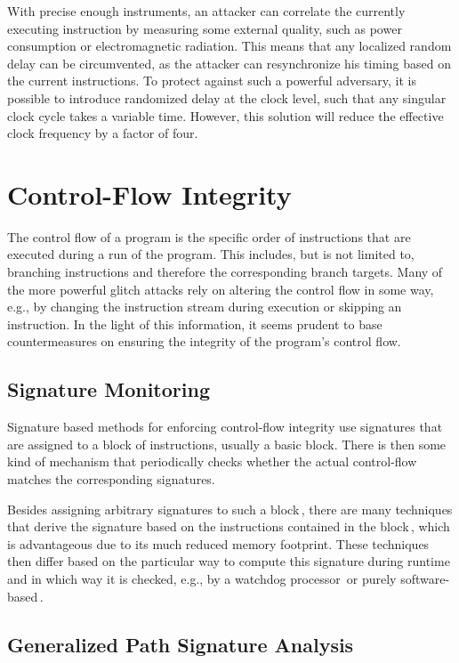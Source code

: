 With precise enough instruments, an attacker can correlate the currently executing instruction by measuring some external quality, such as power consumption or electromagnetic radiation. This means that any localized random delay can be circumvented, as the attacker can resynchronize his timing based on the current instructions. To protect against such a powerful adversary, it is possible to introduce randomized delay at the clock level, such that any singular clock cycle takes a variable time. However, this solution will reduce the effective clock frequency by a factor of four.\,\cite{kommerling1999design}

\section{Control-Flow Integrity}
The control flow of a program is the specific order of instructions that are executed during a run of the program. This includes, but is not limited to, branching instructions and therefore the corresponding branch targets. Many of the more powerful glitch attacks rely on altering the control flow in some way, e.g., by changing the instruction stream during execution or skipping an instruction. In the light of this information, it seems prudent to base countermeasures on ensuring the integrity of the program's control flow.

\subsection{Signature Monitoring}
Signature based methods for enforcing control-flow integrity use signatures that are assigned to a block of instructions, usually a basic block. There is then some kind of mechanism that periodically checks whether the actual control-flow matches the corresponding signatures.

Besides assigning arbitrary signatures to such a block\,\cite{lu1982watchdog}, there are many techniques that derive the signature based on the instructions contained in the block\,\cite{rodriguez2002watchdog, wilken1988continuous, wilken1990continuous}, which is advantageous due to its much reduced memory footprint. These techniques then differ based on the particular way to compute this signature during runtime and in which way it is checked, e.g., by a watchdog processor\,\cite{rodriguez2002watchdog} or purely software-based\,\cite{ersoz1985watchdog}.

\subsection{Generalized Path Signature Analysis}

